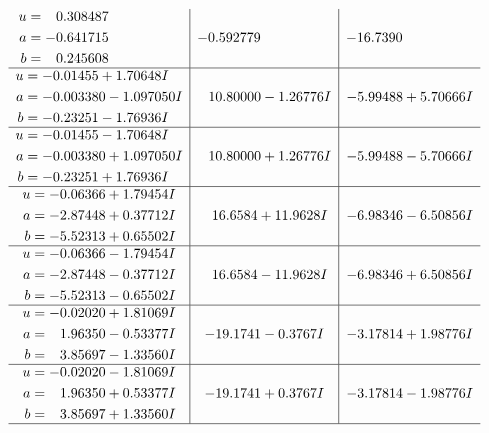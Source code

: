\documentclass[1p]{elsarticle_modified}
\theoremstyle{definition}
\begin{document}
$$\begin{array}{c|c|c}
\begin{aligned}
u &= \phantom{-}0.308487\phantom{ +0.000000I} \\
a &= -0.641715\phantom{ +0.000000I} \\
b &= \phantom{-}0.245608\phantom{ +0.000000I}\end{aligned}
 & -0.592779\phantom{ +0.000000I} & -16.7390\phantom{ +0.000000I} \\ \hline\begin{aligned}
u &= -0.01455 + 1.70648 I \\
a &= -0.003380 - 1.097050 I \\
b &= -0.23251 - 1.76936 I\end{aligned}
 & \phantom{-}10.80000 - 1.26776 I & -5.99488 + 5.70666 I \\ \hline\begin{aligned}
u &= -0.01455 - 1.70648 I \\
a &= -0.003380 + 1.097050 I \\
b &= -0.23251 + 1.76936 I\end{aligned}
 & \phantom{-}10.80000 + 1.26776 I & -5.99488 - 5.70666 I \\ \hline\begin{aligned}
u &= -0.06366 + 1.79454 I \\
a &= -2.87448 + 0.37712 I \\
b &= -5.52313 + 0.65502 I\end{aligned}
 & \phantom{-}16.6584 + 11.9628 I & -6.98346 - 6.50856 I \\ \hline\begin{aligned}
u &= -0.06366 - 1.79454 I \\
a &= -2.87448 - 0.37712 I \\
b &= -5.52313 - 0.65502 I\end{aligned}
 & \phantom{-}16.6584 - 11.9628 I & -6.98346 + 6.50856 I \\ \hline\begin{aligned}
u &= -0.02020 + 1.81069 I \\
a &= \phantom{-}1.96350 - 0.53377 I \\
b &= \phantom{-}3.85697 - 1.33560 I\end{aligned}
 & -19.1741 - 0.3767 I & -3.17814 + 1.98776 I \\ \hline\begin{aligned}
u &= -0.02020 - 1.81069 I \\
a &= \phantom{-}1.96350 + 0.53377 I \\
b &= \phantom{-}3.85697 + 1.33560 I\end{aligned}
 & -19.1741 + 0.3767 I & -3.17814 - 1.98776 I\\
 \hline 
 \end{array}$$\newpage\newpage\renewcommand{\arraystretch}{1}
\end{document}
